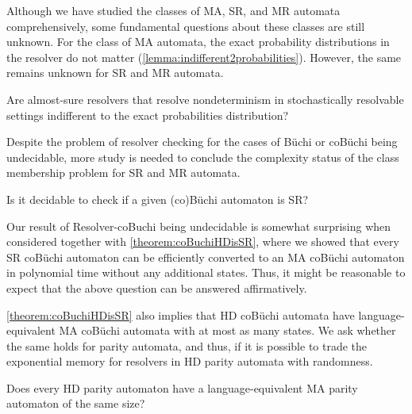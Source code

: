 Although we have studied the classes of MA, SR, and MR automata comprehensively, some fundamental questions about these classes are still unknown. For the class of MA automata, the exact probability distributions in the resolver do not matter (\cref{lemma:indifferent2probabilities}). However, the same remains unknown for SR and MR automata. 
\begin{question}
Are almost-sure resolvers that resolve nondeterminism in stochastically resolvable settings indifferent to the exact probabilities distribution?  
\end{question}
Despite the problem of resolver checking for the cases of B\"uchi or coB\"uchi being undecidable, more study is needed to conclude the complexity status of the class membership problem for SR and MR automata. 
\begin{question}
    Is it decidable to check if a given (co)B\"uchi automaton is SR?
\end{question}
Our result of \textsf{Resolver-coBuchi} being undecidable is somewhat surprising when considered together with \cref{theorem:coBuchiHDisSR}, where we showed that every SR coB\"uchi automaton can be efficiently converted to an MA coB\"uchi automaton in polynomial time without any additional states. Thus, it might be reasonable to expect that the above question can be answered affirmatively.%

\cref{theorem:coBuchiHDisSR} also implies that HD coB\"uchi automata have language-equivalent MA coB\"uchi automata with at most as many states. We ask whether the same holds for parity automata, and thus, if it is  possible to trade the exponential memory for resolvers in HD parity automata with randomness.  
\begin{question}
    Does every HD parity automaton have a language-equivalent MA parity automaton of the same size?
\end{question}



